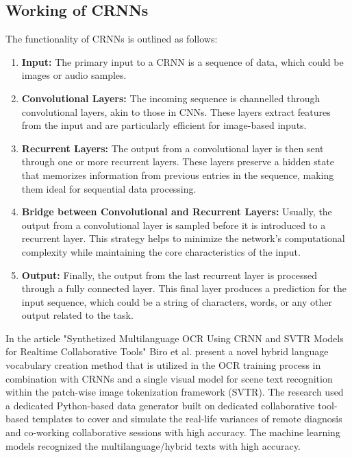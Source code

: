 \subsection{Working of CRNNs}
The functionality of CRNNs is outlined as follows:

\begin{enumerate}
    \item \textbf{Input:} The primary input to a CRNN is a sequence of data, which could be images or audio samples.
    \item \textbf{Convolutional Layers:} The incoming sequence is channelled through convolutional layers, akin to those in CNNs. These layers extract features from the input and are particularly efficient for image-based inputs.
    \item \textbf{Recurrent Layers:} The output from a convolutional layer is then sent through one or more recurrent layers. These layers preserve a hidden state that memorizes information from previous entries in the sequence, making them ideal for sequential data processing.
    \item \textbf{Bridge between Convolutional and Recurrent Layers:} Usually, the output from a convolutional layer is sampled before it is introduced to a recurrent layer. This strategy helps to minimize the network's computational complexity while maintaining the core characteristics of the input.
    \item \textbf{Output:} Finally, the output from the last recurrent layer is processed through a fully connected layer. This final layer produces a prediction for the input sequence, which could be a string of characters, words, or any other output related to the task.
\end{enumerate}

In the article "Synthetized Multilanguage OCR Using CRNN and SVTR Models for Realtime Collaborative Tools" Biro et al. present a novel hybrid language vocabulary creation method that is utilized in the OCR training process in combination with CRNNs and a single visual model for scene text recognition within the patch-wise image tokenization framework (SVTR). The research used a dedicated Python-based data generator built on dedicated collaborative tool-based templates to cover and simulate the real-life variances of remote diagnosis and co-working collaborative sessions with high accuracy. The machine learning models recognized the multilanguage/hybrid texts with high accuracy.

